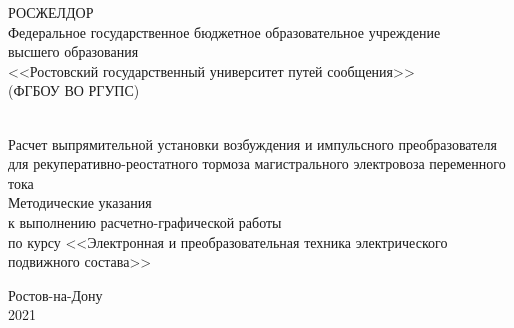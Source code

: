 \begin{titlepage}
 
 \begin{center}

 \small РОСЖЕЛДОР \\
  Федеральное государственное бюджетное образовательное учреждение \\
высшего образования \\ <<Ростовский государственный 
университет путей сообщения>> \\ (ФГБОУ ВО РГУПС) \\[0.5cm]
 \hrulefill \\[3cm]
\end{center}
 
\begin{center}
 
 
 \Large Расчет выпрямительной установки возбуждения и импульсного преобразователя для рекуперативно-реостатного тормоза магистрального электровоза переменного тока \\[3cm]
 \Large Методические указания \\ 
 \large к выполнению расчетно-графической работы \\
 по курсу <<Электронная и преобразовательная техника электрического подвижного состава>>

\end{center} 

\vfill

\begin{center}
 \large Ростов-на-Дону \\
 2021
\end{center}

 
\end{titlepage}
